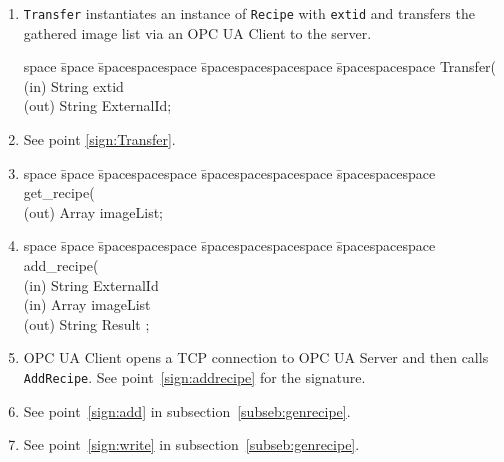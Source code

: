 \begin{enumerate}
    \item \texttt{Transfer} instantiates an instance of \texttt{Recipe} with \texttt{extid} and transfers the gathered image list via an OPC UA Client to the server.
    \begin{tabbing}
    space \= space \= spacespacespace \= spacespacespacespace \= spacespacespace \kill
    \>  Transfer(\\
    \>  \>  (in)	 \> 	String          \> extid\\
    \>  \>  (out)	 \> 	String          \> ExternalId; 
    \end{tabbing} \label{sign:Transfer}
    \item See point \ref{sign:Transfer}.
    \item 
    \begin{tabbing}
    space \= space \= spacespacespace \= spacespacespacespace \= spacespacespace \kill
    \>  get\_recipe(\\
    \>  \>  (out)	 \> 	Array          \> imageList; 
    \end{tabbing}
    \item 
    \begin{tabbing}
    space \= space \= spacespacespace \= spacespacespacespace \= spacespacespace \kill
    \>  add\_recipe(\\
    \>  \>  (in)	 \> 	String          \> ExternalId\\
    \>  \>  (in)	 \> 	Array          \> imageList\\
    \>  \>  (out)	 \> 	String          \> Result ; 
    \end{tabbing}\label{sign:addrecipe}
    \item OPC UA Client opens a TCP connection to OPC UA Server and then calls \texttt{AddRecipe}. See point~\ref{sign:addrecipe} for the signature.
    \item See point~\ref{sign:add} in subsection~\ref{subseb:genrecipe}.
    \item See point~\ref{sign:write} in subsection~\ref{subseb:genrecipe}.
\end{enumerate}

